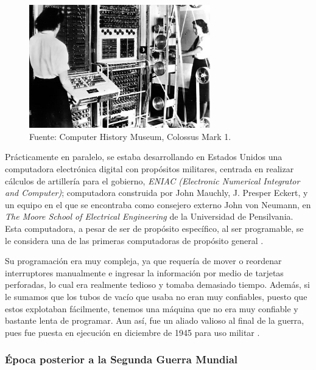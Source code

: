 \documentclass[letterpaper,12pt,oneside]{book}
\begin{document}
		\begin{figure}
		    \centering
		    \includegraphics[width=0.7\textwidth]{media/Historia/CHM_computers_1944.colossus.jpg}
		    \caption{Fuente: Computer History Museum, Colossus Mark 1.}
	    	\label{fig:colossus}
		\end{figure}
		
		Prácticamente en paralelo, se estaba desarrollando
		en Estados Unidos una computadora electrónica digital con propósitos militares, centrada en realizar cálculos de artillería para el gobierno,
		\textit{ENIAC (Electronic Numerical Integrator and Computer)}; computadora construida por John Mauchly, J. Presper Eckert, y un equipo en
		el que se encontraba como consejero externo John von Neumann, en
		\textit{The Moore School of Electrical Engineering} de la Universidad de Pensilvania. Esta computadora, a pesar de ser de propósito específico,
		al ser programable, se le considera una de las primeras computadoras de propósito general \cite{ifrah_universal_2001}. 
  
        Su programación era muy compleja, ya que requería de mover o reordenar
		interruptores manualmente e ingresar la información por medio de tarjetas perforadas, 
		lo cual era realmente tedioso y tomaba demasiado tiempo. Además, si le sumamos que  los tubos de vacío que usaba no eran muy confiables, puesto que estos explotaban 	
		fácilmente, tenemos una máquina que no era muy confiable y  bastante lenta de programar. Aun así, fue un aliado valioso al final de la guerra, pues fue puesta en ejecución en  diciembre de 1945
        para uso militar \cite{ifrah_universal_2001}.
		
        \subsubsection{Época posterior a la Segunda Guerra Mundial}
		
\end{document}

